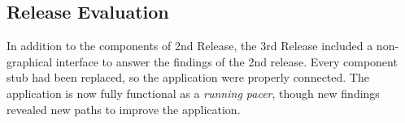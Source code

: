 \subsection{Release Evaluation}
In addition to the components of 2nd Release, the 3rd Release included a non-graphical interface to answer the findings of the 2nd release. Every component stub had been replaced, so the application were properly connected. The application is now fully functional as a \textit{running pacer}, though new findings revealed new paths to improve the application.
